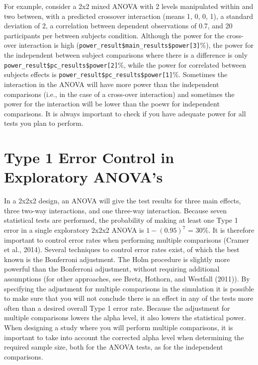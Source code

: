 \documentclass[,jou, draftfirst, a4paper,floatsintext]{apa6}
\begin{document}
For example, consider a 2x2 mixed ANOVA with 2 levels manipulated within and two between, with a predicted crossover interaction (means 1, 0, 0, 1), a standard deviation of 2, a correlation between dependent observations of 0.7, and 20 participants per between subjects condition.
Although the power for the cross-over interaction is high (\texttt{power\_result\$main\_results\$power{[}3{]}}\%), the power for the independent between subject comparisons where there is a difference is only \texttt{power\_result\$pc\_results\$power{[}2{]}}\%, while the power for correlated between subjects effects is \texttt{power\_result\$pc\_results\$power{[}1{]}}\%.
Sometimes the interaction in the ANOVA will have more power than the independent comparisons (i.e., in the case of a cross-over interaction) and sometimes the power for the interaction will be lower than the poewr for independent comparisons.
It is always important to check if you have adequate power for all tests you plan to perform.

\hypertarget{type-1-error-control-in-exploratory-anovas}{%
\section{Type 1 Error Control in Exploratory ANOVA's}\label{type-1-error-control-in-exploratory-anovas}}

In a 2x2x2 design, an ANOVA will give the test results for three main effects, three two-way interactions, and one three-way interaction.
Because seven statistical tests are performed, the probability of making at least one Type 1 error in a single exploratory 2x2x2 ANOVA is \(1-(0.95)^7\) = 30\%.
It is therefore important to control error rates when performing multiple comparisons (Cramer et al., 2014).
Several techniques to control error rates exist, of which the best known is the Bonferroni adjustment.
The Holm procedure is slightly more powerful than the Bonferroni adjustment, without requiring additional assumptions (for other approaches, see Bretz, Hothorn, and Westfall (2011)).
By specifying the adjustment for multiple comparisons in the simulation it is possible to make sure that you will not conclude there is an effect in any of the tests more often than a desired overall Type 1 error rate.
Because the adjustment for multiple comparisons lowers the alpha level, it also lowers the statistical power.
When designing a study where you will perform multiple comparisons, it is important to take into account the corrected alpha level when determining the required sample size, both for the ANOVA tests, as for the independent comparisons.
\end{document}
